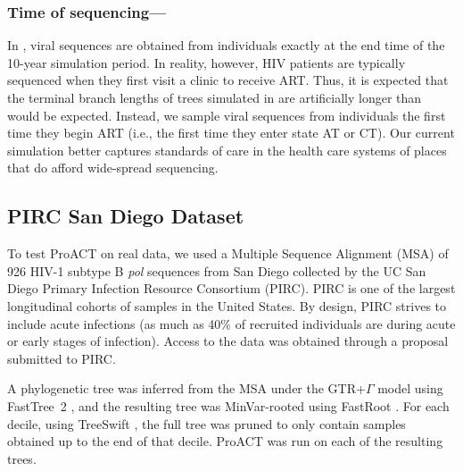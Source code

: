 \documentclass[oupdraft]{sysbio}
\newcommand{\PLWH}{sample\xspace}
\begin{document}
\subsubsection{Time of sequencing---} In \citet{Moshiri2018},
viral sequences are obtained from individuals exactly at the end time of the 10-year simulation period.
In reality, however,
HIV patients are typically sequenced when they first visit a clinic to receive ART.
Thus, it is expected that the terminal branch lengths of trees simulated in \citet{Moshiri2018} are artificially longer than would be expected.
Instead,
we sample viral sequences from individuals the first time they begin ART (i.e., the first time they enter state AT or CT).
Our current simulation better captures standards of care in the health care systems of places that do afford wide-spread sequencing. 


\subsection{PIRC San Diego Dataset}
To test ProACT on real data, we used a Multiple Sequence Alignment (MSA) of 926 HIV-1 subtype B \textit{pol} sequences from San Diego collected by the UC San Diego Primary Infection Resource Consortium (PIRC). 
PIRC  is one of the largest longitudinal cohorts of \PLWH{s} in the United States. By design, PIRC strives to include acute infections (as much as 40\% of recruited individuals are during acute or early stages of infection).  
Access to the data was obtained through a proposal submitted to PIRC.

A phylogenetic tree was inferred from the MSA under the GTR+$\Gamma$ model using FastTree~2 \cite{Price2010}, and the resulting tree was MinVar-rooted using FastRoot \cite{Mai2017}. For each decile, using TreeSwift \cite{Moshiri2018b}, the full tree was pruned to only contain samples obtained up to the end of that decile. ProACT was run on each of the resulting trees.
\end{document}

